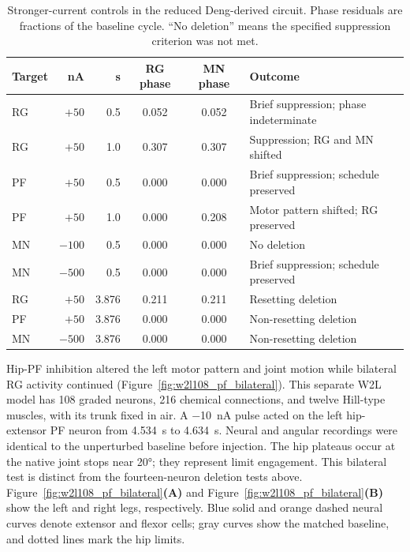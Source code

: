 \begin{table}[htbp]
\centering\small
\caption[Layer-specific stimulation controls]{Stronger-current controls in the reduced Deng-derived circuit. Phase residuals are fractions of the baseline cycle. ``No deletion'' means the specified suppression criterion was not met.}
\label{tab:layer_stimulus}
\begin{tabularx}{\textwidth}{@{}lrrcc>{\raggedright\arraybackslash}X@{}}
\toprule
Target & \unit{\nano\ampere} & \unit{\second} & RG phase & MN phase & Outcome \\
\midrule
RG & $+50$ & 0.5 & 0.052 & 0.052 & Brief suppression; phase indeterminate \\
RG & $+50$ & 1.0 & 0.307 & 0.307 & Suppression; RG and MN shifted \\
PF & $+50$ & 0.5 & 0.000 & 0.000 & Brief suppression; schedule preserved \\
PF & $+50$ & 1.0 & 0.000 & 0.208 & Motor pattern shifted; RG preserved \\
MN & $-100$ & 0.5 & 0.000 & 0.000 & No deletion \\
MN & $-500$ & 0.5 & 0.000 & 0.000 & Brief suppression; schedule preserved \\
RG & $+50$ & 3.876 & 0.211 & 0.211 & Resetting deletion \\
PF & $+50$ & 3.876 & 0.000 & 0.000 & Non-resetting deletion \\
MN & $-500$ & 3.876 & 0.000 & 0.000 & Non-resetting deletion \\
\bottomrule
\end{tabularx}
\end{table}

Hip-PF inhibition altered the left motor pattern and joint motion while bilateral RG activity continued (Figure~\ref{fig:w2l108_pf_bilateral}). This separate W2L model has 108 graded neurons, 216 chemical connections, and twelve Hill-type muscles, with its trunk fixed in air. A \qty{-10}{\nano\ampere} pulse acted on the left hip-extensor PF neuron from \qty{4.534}{\second} to \qty{4.634}{\second}. Neural and angular recordings were identical to the unperturbed baseline before injection. The hip plateaus occur at the native joint stops near \ang{20}; they represent limit engagement. This bilateral test is distinct from the fourteen-neuron deletion tests above. Figure~\ref{fig:w2l108_pf_bilateral}\textbf{(A)} and Figure~\ref{fig:w2l108_pf_bilateral}\textbf{(B)} show the left and right legs, respectively. Blue solid and orange dashed neural curves denote extensor and flexor cells; gray curves show the matched baseline, and dotted lines mark the hip limits.

